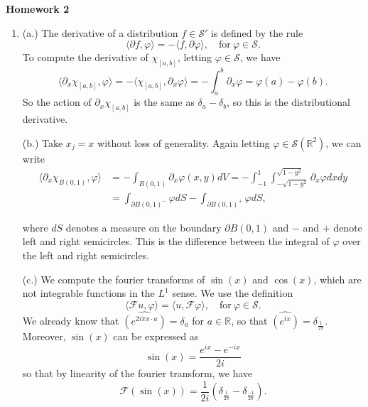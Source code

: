 \documentclass[11pt, reqno]{article}
\theoremstyle{plain}
\theoremstyle{definition}
\theoremstyle{remark}
\renewcommand{\phi}{\varphi}
\newcommand{\RR}{\mathbb{R}}
\begin{document}
\topmargin=-40pt
\renewcommand{\headrulewidth}{1pt}
\renewcommand{\headsep}{20pt}
\thispagestyle{fancy}

{\Huge \bfseries \noindent Homework 2}

\begin{enumerate}
    \item[2.3.4.] (a.) The derivative of a distribution $f \in \mathscr{S}'$ is defined by the rule
    \[
        \langle \partial f, \phi\rangle = - \langle f, \partial \phi\rangle,\quad \text{for}\ \phi \in \mathscr{S}.
    \]
    To compute the derivative of $\chi_{[a,b]}$, letting $\phi \in \mathscr{S}$, we have
    \[
        \langle \partial_x \chi_{[a,b]}, \phi\rangle = -\langle \chi_{[a,b]}, \partial_x \phi\rangle = -\int_a^b \partial_x \phi = \phi(a) - \phi(b).
    \]
    So the action of $\partial_x \chi_{[a,b]}$ is the same as $\delta_a - \delta_b$, so this is the distributional derivative.

    (b.) Take $x_j = x$ without loss of generality. Again letting $\phi \in \mathscr{S}(\RR^2)$, we can write
    \begin{align*}
        \langle \partial_x \chi_{B(0,1)}, \phi\rangle &= -\int_{B(0,1)} \partial_x \phi(x, y) dV = 
        -\int_{-1}^1 \int_{-\sqrt{1 - y^2}}^{\sqrt{1 - y^2}}\partial_x \phi dx dy\\
        &= \int_{\partial B(0,1)^-} \phi dS - \int_{\partial B(0,1)^+} \phi dS,
    \end{align*}

    where $dS$ denotes a measure on the boundary $\partial B(0,1)$ and $-$ and $+$ denote left and right semicircles. This is the difference between the integral of $\phi$ over the left and
    right semicircles.

    (c.) We compute the fourier transforms of $\sin(x)$ and $\cos(x)$, which are not integrable functions in the $L^1$ sense. We use the definition
    \[
        \langle \mathscr{F}u, \phi\rangle = \langle u, \mathscr{F}\phi\rangle,\quad \text{for}\ \phi \in \mathscr{S}.
    \]
    We already know that $\widehat{\left(e^{2i \pi x \cdot a}\right)} = \delta_a$ for $a \in \RR$, so that $\widehat{\left(e^{ix}\right)} = \delta_{\frac{1}{2\pi}}$. 
    Moreover, $\sin(x)$ can be expressed as
    \[
        \sin(x) = \frac{e^{ix} - e^{-ix}}{2i}
    \]
    so that by linearity of the fourier transform, we have
    \[
        \mathscr{F}(\sin(x)) = \frac{1}{2i}\left(\delta_{\frac{1}{2\pi}} - \delta_{\frac{-1}{2\pi}}\right).
    \]


\end{enumerate}
\end{document}
